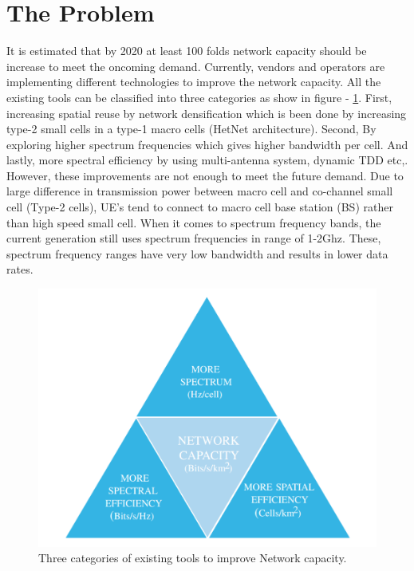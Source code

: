 \documentclass[12pt,onecolumn]{IEEEtran}
\begin{document}
\section{The Problem}
\label{sec:TP}
It is estimated that by 2020 at least 100 folds network capacity should be increase to meet the oncoming demand. Currently, vendors and operators are implementing different technologies to improve the network capacity. All the existing tools can be classified into three categories as show in figure - \ref{fig:NWCP}. First, increasing spatial reuse by network densification  which is been done by increasing type-2 small cells in a type-1 macro cells (HetNet architecture). Second, By exploring higher spectrum frequencies which gives higher bandwidth per cell. And lastly, more spectral efficiency by using multi-antenna system, dynamic TDD etc,. However, these improvements are not enough to meet the future demand. Due to large difference in transmission power between macro cell and co-channel small cell (Type-2 cells), UE's tend to connect to macro cell base station (BS) rather than high speed small cell. When it comes to spectrum frequency bands, the current generation still uses spectrum frequencies in range of 1-2Ghz. These, spectrum frequency ranges have very low bandwidth and results in lower data rates.

\begin{figure}[ht]
\includegraphics[scale=0.3]{nwcp_class}
\centering
\caption{Three categories of existing tools to improve Network capacity.}
\label{fig:NWCP}
\end{figure}
\end{document}
